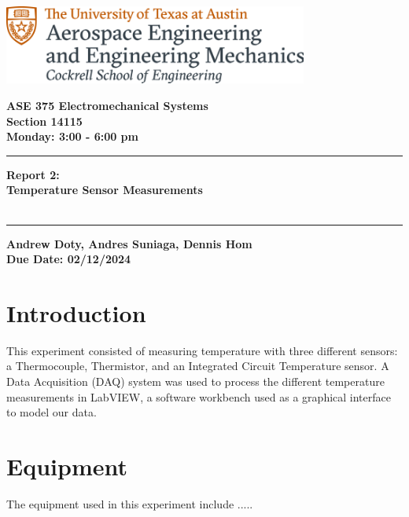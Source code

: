 \documentclass{article}
\begin{document}
\begin{titlepage}
  \centering
  \includegraphics[width=10cm]{ase-logo-formal.png}  %
  \vspace{1cm}  %
 
  \Large \textbf{ASE 375 Electromechanical Systems}\\
  \large \textbf{Section 14115}\\
  \vspace{0.5cm}
  \textbf{Monday: 3:00 - 6:00 pm}\\
 
  \vspace{1cm}
 
  \hrule
  \vspace{0.5cm}
 
  \Huge \textbf{Report 2:\\
  Temperature Sensor Measurements}\\
  \Huge \textbf{}\\
 
  \vspace{0.5cm}
  \hrule
 
  \vspace{1cm}
 
  \normalsize \textbf{Andrew Doty, Andres Suniaga, Dennis Hom}\\
  \normalsize \textbf{Due Date: 02/12/2024}
 
\end{titlepage}
\newpage

\tableofcontents
\thispagestyle{empty}
\newpage



\section{Introduction}
This experiment consisted of measuring temperature with three different sensors: a Thermocouple, Thermistor, and an Integrated Circuit Temperature sensor. A Data Acquisition (DAQ) system was used to process the different temperature measurements in LabVIEW, a software workbench used as a graphical interface to model our data.


\section{Equipment}
The equipment used in this experiment include .....
\end{document}
